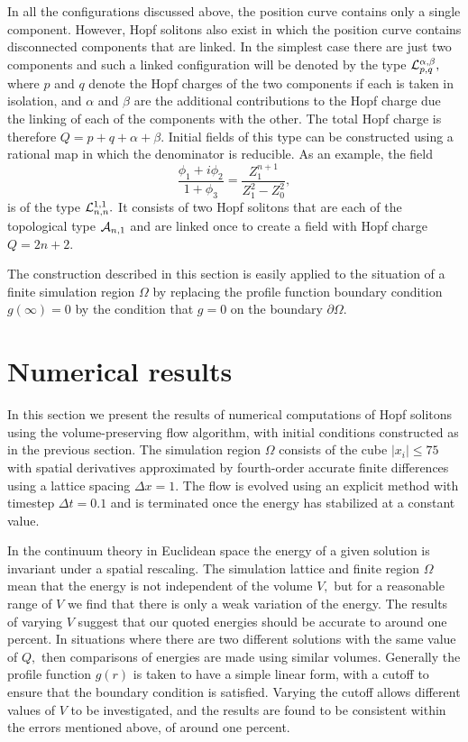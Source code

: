 \documentclass[12pt]{article}
\newcommand{\be}{\begin{equation}}
\newcommand{\ee}{\end{equation}}
\newcommand{\news}{\setcounter{equation}{0}\quad}
\begin{document}
In all the configurations discussed above, the position curve contains
only a single component. However, Hopf solitons also exist in which the 
position curve contains disconnected components that are linked.
In the simplest case there are just two components and such a linked 
configuration will be denoted by the type ${\cal L}_{p,q}^{\alpha,\beta},$
where $p$ and $q$ denote the Hopf charges of the two components if each 
is taken in isolation, and $\alpha$ and $\beta$ are the additional 
contributions to the Hopf charge due the linking of each of the
components with the other. The total Hopf charge is therefore
$Q=p+q+\alpha+\beta.$  
Initial fields of this type can be constructed using a rational map
in which the denominator is reducible. As an example, the field
\be
\frac{\phi_1+i\phi_2}{1+\phi_3}=\frac{Z_1^{n+1}}{Z_1^2-Z_0^2},
\label{Qlink}
\ee
is of the type ${\cal L}_{n,n}^{1,1}.$ It consists of two Hopf 
solitons that are each of the topological type ${\cal A}_{n,1}$ and 
are linked once to create a field with Hopf charge $Q=2n+2.$

The construction described in this section is easily applied to
the situation of a finite simulation region $\Omega$ by replacing
the profile function boundary condition $g(\infty)=0$ by the
condition that $g=0$ on the boundary $\partial \Omega.$ 
 
\section{Numerical results}\label{sec-num}\news
In this section we present the results
of numerical computations of Hopf solitons using the volume-preserving
flow algorithm, with initial conditions constructed as in the
previous section. The simulation region $\Omega$ consists of the
cube $|x_i|\le 75$ with spatial derivatives approximated by
fourth-order accurate finite differences using a lattice spacing $\Delta x=1.$
The flow is evolved using an explicit method with
timestep $\Delta t=0.1$ and is terminated once the energy has
stabilized at a constant value. 

In the continuum theory in Euclidean space the energy of a given solution
is invariant under a spatial rescaling. The simulation lattice and finite
region $\Omega$ mean that the energy is not independent of the volume $V,$
but for a reasonable range of $V$ we find that there is only a weak variation of the
energy. The results of varying $V$ suggest that our quoted energies 
should be accurate to around one percent. In situations where there are
two different solutions with the same value of $Q,$ then comparisons of
energies are made using similar volumes. 
Generally the profile function
$g(r)$ is taken to have a simple linear form, with a cutoff to ensure
that the boundary condition is satisfied. Varying the cutoff allows different
values of $V$ to be investigated, and the results are found to be
consistent within the errors mentioned above, of around one percent.
\end{document}
